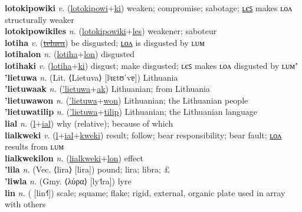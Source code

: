 \textbf{lotokipowiki} \textit{v.} (\hyperref[lotokipowi]{lotokipowi}+\hyperref[ki]{ki})
weaken; compromise; sabotage; \hyperref[lotokipowikiles]{ʟєꜱ} makes ʟᴏᴧ structurally weaker \label{lotokipowiki} \\
\textbf{lotokipowikiles} \textit{n.} (\hyperref[lotokipowiki]{lotokipowiki}+\hyperref[les]{les})
weakener; saboteur \label{lotokipowikiles} \\
\textbf{lotiha} \textit{v.} (\hyperref[teluca]{\sout{teluca}})
be disgusted; \hyperref[lotihalon]{ʟᴏᴧ} is disgusted by ʟᴜᴍ \label{lotiha} \\
\textbf{lotihalon} \textit{n.} (\hyperref[lotiha]{lotiha}+\hyperref[lon]{lon})
disgusted \label{lotihalon} \\
\textbf{lotihaki} \textit{v.} (\hyperref[lotiha]{lotiha}+\hyperref[ki]{ki})
disgust; make disgusted; ʟєꜱ makes ʟᴏᴧ disgusted by ʟᴜᴍ" \label{lotihaki} \\
\textbf{'lietuwa} \textit{n.} (Lit. ⟨Lietuva⟩ [lʲɪɛtʊˈvɐ])
Lithuania \label{'lietuwa} \\
\textbf{'lietuwaak} \textit{n.} (\hyperref['lietuwa]{'lietuwa}+\hyperref[ak]{ak})
Lithuanian; from Lithuania \label{'lietuwaak} \\
\textbf{'lietuwawon} \textit{n.} (\hyperref['lietuwa]{'lietuwa}+\hyperref[won]{won})
Lithuanian; the Lithuanian people \label{'lietuwawon} \\
\textbf{'lietuwatilip} \textit{n.} (\hyperref['lietuwa]{'lietuwa}+\hyperref[tilip]{tilip})
Lithuanian; the Lithuanian language \label{'lietuwatilip} \\
\textbf{lial} \textit{n.} (\hyperref[l]{l}+\hyperref[ial]{ial})
why (relative); because of which \label{lial} \\
\textbf{lialkweki} \textit{v.} (\hyperref[l]{l}+\hyperref[ial]{ial}+\hyperref[kweki]{kweki})
result; follow; bear responsibility; bear fault; \hyperref[lialkwekilon]{ʟᴏᴧ} results from ʟᴜᴍ \label{lialkweki} \\
\textbf{lialkwekilon} \textit{n.} (\hyperref[lialkweki]{lialkweki}+\hyperref[lon]{lon})
effect \label{lialkwekilon} \\
\textbf{'lila} \textit{n.} (Vec. ⟨lira⟩ [lira])
pound; lira; libra; £ \label{'lila} \\
\textbf{'liwla} \textit{n.} (Gmy. ⟨λύρα⟩ [ly˦ra])
lyre \label{'liwla} \\
\textbf{lin} \textit{n.} ( [lin˧˥])
scale; squame; flake; rigid, external, organic plate used in array with others \label{lin} \\
